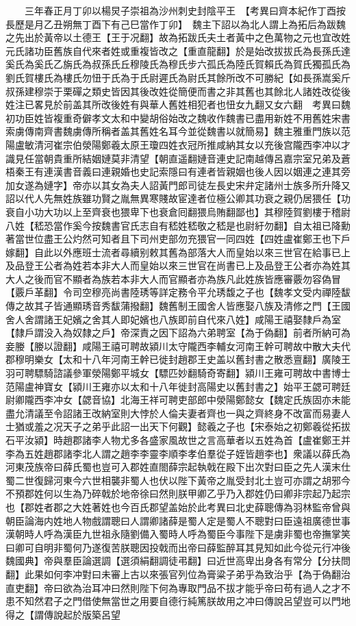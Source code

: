 　　三年春正月丁卯以楊炅子崇祖為沙州刺史封陰平王　【考異曰齊本紀作丁酉按長歷是月乙丑朔無丁酉下有己巳當作丁卯】　魏主下詔以為北人謂上為拓后為跋魏之先出於黃帝以土德王【王于况翻】故為拓跋氏夫土者黃中之色萬物之元也宜改姓元氏諸功臣舊族自代來者姓或重複皆改之【重直龍翻】於是始改拔拔氏為長孫氏達奚氏為奚氏乙旃氏為叔孫氏丘穆陵氏為穆氏步六孤氏為陸氏賀賴氏為賀氏獨孤氏為劉氏賀樓氏為樓氏勿忸于氏為于氏尉遲氏為尉氏其餘所改不可勝紀【如長孫嵩奚斤叔孫建穆崇于栗磾之類史皆因其後改姓從簡便而書之非其舊也其餘北人諸姓改從後姓注已畧見於前盖其所改後姓有與華人舊姓相犯者也忸女九翻又女六翻　考異曰魏初功臣姓皆複重奇僻孝文太和中變胡俗始改之魏收作魏書已盡用新姓不用舊姓宋書索虜傳南齊書魏虜傳所稱者盖其舊姓名耳今並從魏書以就簡易】魏主雅重門族以范陽盧敏清河崔宗伯滎陽鄭羲太原王瓊四姓衣冠所推咸納其女以充後宫隴西李冲以才識見任當朝貴重所結姻㜕莫非清望【朝直遥翻㜕音連史記南越傳呂嘉宗室兄弟及蒼梧秦王有連漢書音義曰連親婚也史記索隱曰有連者皆親姻也後人因以姻連之連其旁加女遂為㜕字】帝亦以其女為夫人詔黃門郎司徒左長史宋弁定諸州士族多所升降又詔以代人先無姓族雖功賢之胤無異寒賤故宦達者位極公卿其功衰之親仍居猥任【功衰自小功大功以上至齊衰也猥卑下也衰倉囘翻猥烏賄翻鄙也】其穆陸賀劉樓于稽尉八姓【嵇恐當作奚今按魏書官氏志自有嵇姓嵇敬之嵇是也尉紆勿翻】自太祖已降勳著當世位盡王公灼然可知者且下司州吏部勿充猥官一同四姓【四姓盧崔鄭王也下戶嫁翻】自此以外應班士流者尋續别敕其舊為部落大人而皇始以來三世官在給事已上及品登王公者為姓若本非大人而皇始以來三世官在尚書已上及品登王公者亦為姓其大人之後而官不顯者為族若本非大人而官顯者亦為族凡此姓族皆應審覈勿容偽冒【覈戶革翻】令司空穆亮尚書陸琇等詳定務令平允琇馥之子也【魏孝文受内禪陸馛傳之故其子皆通顯琇音秀馛蒲撥翻】魏舊制王國舍人皆應娶八族及清修之門【王國舍人舍謂諸王妃嬪之舍其人即妃嬪也八族即前自代來八姓】咸陽王禧娶隸戶為室【隸戶謂没入為奴隸之戶】帝深責之因下詔為六弟聘室【為于偽翻】前者所納可為妾媵【媵以證翻】咸陽王禧可聘故潁川太守隴西李輔女河南王幹可聘故中散大夫代郡穆明樂女【太和十八年河南王幹已徙封趙郡王史盖以舊封書之散悉亶翻】廣陵王羽可聘驃騎諮議參軍滎陽鄭平城女【驃匹妙翻騎奇寄翻】潁川王雍可聘故中書博士范陽盧神寶女【潁川王雍亦以太和十八年徙封高陽史以舊封書之】始平王勰可聘廷尉卿隴西李冲女【勰音協】北海王祥可聘吏部郎中滎陽鄭懿女【魏定氏族固亦未能盡允清議至令詔諸王改納室則大悖於人倫夫妻者齊也一與之齊終身不改富而易妻人士猶或羞之况天子之弟乎此詔一出天下何觀】懿羲之子也【宋泰始之初鄭羲從拓拔石平汝潁】時趙郡諸李人物尤多各盛家風故世之言高華者以五姓為首【盧崔鄭王并李為五姓趙郡諸李北人謂之趙李李靈李順李孝伯羣從子姪皆趙李也】衆議以薛氏為河東茂族帝曰薛氏蜀也豈可入郡姓直閤薛宗起執戟在殿下出次對曰臣之先人漢末仕蜀二世復歸河東今六世相襲非蜀人也伏以陛下黃帝之胤受封北土豈可亦謂之胡邪今不預郡姓何以生為乃碎戟於地帝徐曰然則朕甲卿乙乎乃入郡姓仍曰卿非宗起乃起宗也【郡姓者郡之大姓著姓也今百氏郡望盖始於此考異曰北史薛聰傳為羽林監帝曾與朝臣論海内姓地人物戲謂聰曰人謂卿諸薛是蜀人定是蜀人不聰對曰臣遠祖廣德世事漢朝時人呼為漢臣九世祖永隨劉備入蜀時人呼為蜀臣今事陛下是虜非蜀也帝撫掌笑曰卿可自明非蜀何乃遂復苦朕聰因投戟而出帝曰薛監醉耳其見知如此今從元行冲後魏國典】帝與羣臣論選調【選須絹翻調徒弔翻】曰近世高卑出身各有常分【分扶問翻】此果如何李冲對曰未審上古以來張官列位為膏粱子弟乎為致治乎【為于偽翻治直吏翻】帝曰欲為治耳冲曰然則陛下何為專取門品不拔才能乎帝曰苟有過人之才不患不知然君子之門借使無當世之用要自德行純篤朕故用之冲曰傳說呂望豈可以門地得之【謂傳說起於版築呂望